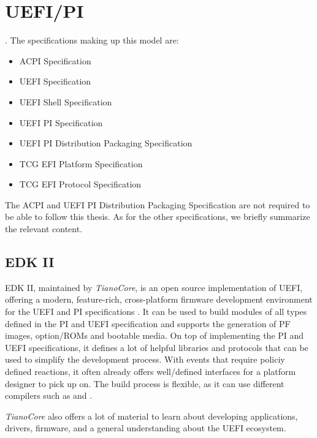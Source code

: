 
\chapter{\acs{UEFI}/\acs{PI}}

.
The specifications making up this model are:

\begin{itemize}
    \item \acs{ACPI} Specification
    \item \acs{UEFI} Specification
    \item \acs{UEFI} Shell Specification
    \item \acs{UEFI} \acs{PI} Specification
    \item \acs{UEFI} \acs{PI} Distribution Packaging Specification
    \item \acs{TCG} \acs{EFI} Platform Specification
    \item \acs{TCG} \acs{EFI} Protocol Specification
\end{itemize}

The \ac{ACPI} and \ac{UEFI} \ac{PI} Distribution Packaging Specification are not required to be able to follow this thesis.
As for the other specifications, we briefly summarize the relevant content.


\clearpage


\clearpage


\clearpage


\section{\acs{EDK} II}

\ac{EDK} II, maintained by \emph{TianoCore}, is an open source implementation of \ac{UEFI}, offering a modern, feature-rich, cross-platform firmware development environment for the \ac{UEFI} and \ac{PI} specifications \cite{tianocore}.
It can be used to build modules of all types defined in the \ac{PI} and \ac{UEFI} specification and supports the generation of \ac{PF} images, option\-/\acp{ROM} and bootable media.
On top of implementing the \ac{PI} and \ac{UEFI} specifications, it defines a lot of helpful libraries and protocols that can be used to simplify the development process.
With events that require policiy defined reactions, it often already offers well\-/defined interfaces for a platform designer to pick up on.
The build process is flexible, as it can use different compilers such as  and .

\emph{TianoCore} also offers a lot of material to learn about developing applications, drivers, firmware, and a general understanding about the \ac{UEFI} ecosystem.
